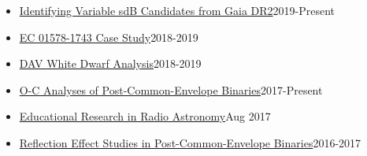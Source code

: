 \documentclass[letterpaper,12pt]{article}
\begin{document}
\vspace{-2mm}
\begin{itemize}
    \item \href{https://www.kyleacorcoran.com/gaia}{\textcolor{rotundaorange}{Identifying Variable sdB Candidates from Gaia DR2}}\hfill 2019-Present\vspace{-3mm}
    \item \href{https://www.kyleacorcoran.com/ec-015781743}{\textcolor{rotundaorange}{EC 01578-1743 Case Study}}\hfill 2018-2019\vspace{-3mm}
    \item \href{https://www.kyleacorcoran.com/dav-white-dwarfs}{\textcolor{rotundaorange}{DAV White Dwarf Analysis}}\hfill 2018-2019\vspace{-3mm}
    \item \href{https://www.kyleacorcoran.com/oc-analysis}{\textcolor{rotundaorange}{O-C Analyses of Post-Common-Envelope Binaries}}\hfill 2017-Present\vspace{-3mm}
    \item \href{https://www.kyleacorcoran.com/erira}{\textcolor{rotundaorange}{Educational Research in Radio Astronomy}}\hfill Aug 2017\vspace{-3mm}
    \item \href{https://www.kyleacorcoran.com/reflection-effect-in-hw-vir-binaries}{\textcolor{rotundaorange}{Reflection Effect Studies in Post-Common-Envelope Binaries}}\hfill 2016-2017\vspace{-2mm}
    
\end{itemize}

\vspace{3mm}
\noindent{}
\end{document}
